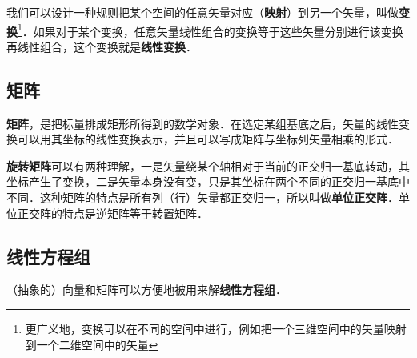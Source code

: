 我们可以设计一种规则把某个空间的任意矢量对应（\textbf{映射}）到另一个矢量，叫做\textbf{变换}\footnote{更广义地，变换可以在不同的空间中进行，例如把一个三维空间中的矢量映射到一个二维空间中的矢量}．如果对于某个变换，任意矢量线性组合的变换等于这些矢量分别进行该变换再线性组合，这个变换就是\textbf{线性变换}．

\subsection{矩阵}

\textbf{矩阵}，是把标量排成矩形所得到的数学对象．在选定某组基底之后，矢量的线性变换可以用其坐标的线性变换表示，并且可以写成矩阵与坐标列矢量相乘的形式．


\textbf{旋转矩阵}可以有两种理解，一是矢量绕某个轴相对于当前的正交归一基底转动，其坐标产生了变换，二是矢量本身没有变，只是其坐标在两个不同的正交归一基底中不同．这种矩阵的特点是所有列（行）矢量都正交归一，所以叫做\textbf{单位正交阵}．单位正交阵的特点是逆矩阵等于转置矩阵．






\subsection{线性方程组}

（抽象的）向量和矩阵可以方便地被用来解\textbf{线性方程组}．
